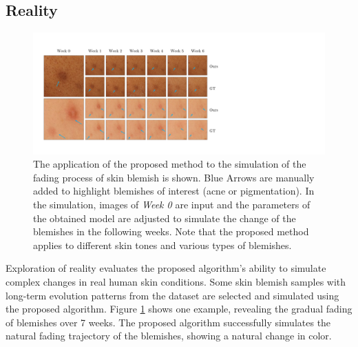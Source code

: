 \begin{spacing}{1.5}
\section{Reality}
\begin{figure}[t!]
    \centering
        \includegraphics[width=\columnwidth]{Chapter5/forward3.pdf}
    \caption{The application of the proposed method to the simulation of the fading process of skin blemish is shown. Blue Arrows are manually added to highlight blemishes of interest (acne or pigmentation). In the simulation, images of \textit{Week 0} are input and the parameters of the obtained model are adjusted to simulate the change of the blemishes in the following weeks. Note that the proposed method applies to different skin tones and various types of blemishes.}
    \label{fig:forward}
\end{figure}
Exploration of reality evaluates the proposed algorithm's ability to simulate complex changes in real human skin conditions. Some skin blemish samples with long-term evolution patterns from the dataset are selected and simulated using the proposed algorithm. Figure \ref{fig:forward} shows one example, revealing the gradual fading of blemishes over 7 weeks. The proposed algorithm successfully simulates the natural fading trajectory of the blemishes, showing a natural change in color.


\end{spacing}
